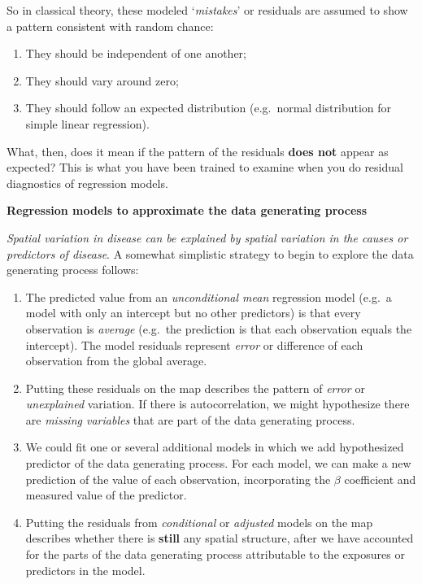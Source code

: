 \documentclass[
]{book}
\providecommand{\tightlist}{%
  \setlength{\itemsep}{0pt}\setlength{\parskip}{0pt}}
\newenvironment{rmdnote}[1]
  {
  \begin{itemize}
  \renewcommand{\labelitemi}{
    \raisebox{-.7\height}[0pt][0pt]{
      {\setkeys{Gin}{width=3em,keepaspectratio}\texttt{[image: images/\#1]}}
    }
  }
  \setlength{\fboxsep}{1em}
  \begin{note}
  \item
  }
  {
  \end{note}
  \end{itemize}
  }
\begin{document}
So in classical theory, these modeled `\emph{mistakes}' or residuals are assumed to show a pattern consistent with random chance:

\begin{enumerate}
\def\labelenumi{\arabic{enumi}.}
\tightlist
\item
  They should be independent of one another;
\item
  They should vary around zero;
\item
  They should follow an expected distribution (e.g.~normal distribution for simple linear regression).
\end{enumerate}

What, then, does it mean if the pattern of the residuals \textbf{does not} appear as expected? This is what you have been trained to examine when you do residual diagnostics of regression models.

\begin{rmdnote}{note}

\textbf{Regression models to approximate the data generating process}

\emph{Spatial variation in disease can be explained by spatial variation in the causes or predictors of disease}. A somewhat simplistic strategy to begin to explore the data generating process follows:

\begin{enumerate}
\def\labelenumi{\arabic{enumi}.}
\tightlist
\item
  The predicted value from an \emph{unconditional mean} regression model (e.g.~a model with only an intercept but no other predictors) is that every observation is \emph{average} (e.g.~the prediction is that each observation equals the intercept). The model residuals represent \emph{error} or difference of each observation from the global average.
\item
  Putting these residuals on the map describes the pattern of \emph{error} or \emph{unexplained} variation. If there is autocorrelation, we might hypothesize there are \emph{missing variables} that are part of the data generating process.
\item
  We could fit one or several additional models in which we add hypothesized predictor of the data generating process. For each model, we can make a new prediction of the value of each observation, incorporating the \(\beta\) coefficient and measured value of the predictor.
\item
  Putting the residuals from \emph{conditional} or \emph{adjusted} models on the map describes whether there is \textbf{still} any spatial structure, after we have accounted for the parts of the data generating process attributable to the exposures or predictors in the model.
\end{enumerate}

\end{rmdnote}
\end{document}
